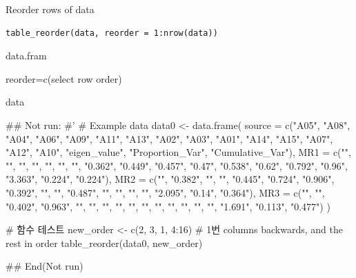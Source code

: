 \documentclass[a4paper]{book}
\begin{document}
%
\begin{Description}
Reorder rows of data
\end{Description}
%
\begin{Usage}
\begin{verbatim}
table_reorder(data, reorder = 1:nrow(data))
\end{verbatim}
\end{Usage}
%
\begin{Arguments}
\begin{ldescription}
\item[\code{data}] data.fram

\item[\code{reorder}] reorder=c(select row order)
\end{ldescription}
\end{Arguments}
%
\begin{Value}
data
\end{Value}
%
\begin{Examples}
\begin{ExampleCode}

\#\# Not run: 
#'
# Example data
data0 <- data.frame(
  source = c("A05", "A08", "A04", "A06",
  "A09", "A11", "A13", "A02", "A03", "A01",
  "A14", "A15", "A07", "A12", "A10",
  "eigen_value", "Proportion_Var", "Cumulative_Var"),
  MR1 = c("", "", "", "", "", "", "", "0.362",
  "0.449", "0.457", "0.47", "0.538", "0.62",
  "0.792", "0.96", "3.363", "0.224", "0.224"),
  MR2 = c("", "0.382", "", "", "0.445", "0.724",
  "0.906", "0.392", "", "", "0.487", "", "", "",
   "", "2.095", "0.14", "0.364"),
  MR3 = c("", "", "0.402", "0.963", "", "", "",
  "", "", "", "", "", "", "", "", "1.691",
  "0.113", "0.477")
)

# 함수 테스트
new_order <- c(2, 3, 1, 4:16)
# 1번 columns backwards, and the rest in order
table_reorder(data0, new_order)

## End(Not run)

\end{ExampleCode}
\end{Examples}
\end{document}
